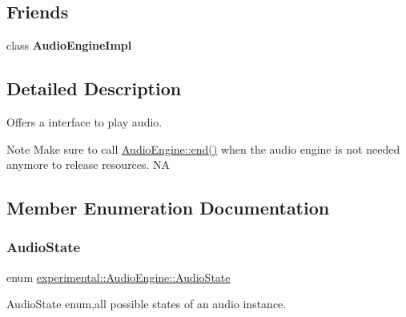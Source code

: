 \subsection*{Friends}
\begin{DoxyCompactItemize}
\item 
\mbox{\label{classexperimental_1_1AudioEngine_a8e0222d6e9b81346186667563adf95a7}} 
class {\bfseries Audio\+Engine\+Impl}
\end{DoxyCompactItemize}


\subsection{Detailed Description}
Offers a interface to play audio. 

\begin{DoxyNote}{Note}
Make sure to call \hyperlink{classexperimental_1_1AudioEngine_a17ea6cda24d6c4d951d5b60b6d2afca0}{Audio\+Engine\+::end()} when the audio engine is not needed anymore to release resources.  NA 
\end{DoxyNote}


\subsection{Member Enumeration Documentation}
\mbox{\label{classexperimental_1_1AudioEngine_ab7becf9cab1f5e4cac089a1f6e3785e6}} 
\subsubsection{\texorpdfstring{Audio\+State}{AudioState}\hspace{0.1cm}{\footnotesize\ttfamily [1/2]}}
{\footnotesize\ttfamily enum \hyperlink{classexperimental_1_1AudioEngine_ab7becf9cab1f5e4cac089a1f6e3785e6}{experimental\+::\+Audio\+Engine\+::\+Audio\+State}\hspace{0.3cm}{\ttfamily [strong]}}

Audio\+State enum,all possible states of an audio instance. \mbox{\label{classexperimental_1_1AudioEngine_ab7becf9cab1f5e4cac089a1f6e3785e6}} 
